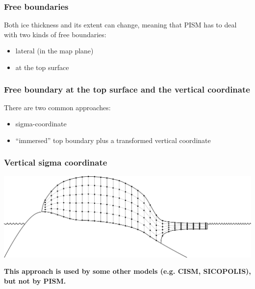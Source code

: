 \documentclass[hide notes,intlimits]{beamer}
\begin{document}
\begin{frame}
  \frametitle{Free boundaries}
  Both ice thickness and its extent can change, meaning that PISM has
  to deal with two kinds of free boundaries:

  \begin{itemize}
  \item lateral (in the map plane)
  \item at the top surface
  \end{itemize}
\end{frame}


\begin{frame}
  \frametitle{Free boundary at the top surface and the vertical coordinate}
  There are two common approaches:
  \begin{itemize}
  \item sigma-coordinate
  \item ``immersed'' top boundary plus a transformed vertical
    coordinate
  \end{itemize}
\end{frame}

\begin{frame}
  \frametitle{Vertical sigma coordinate}
  \begin{center}
    \includegraphics[width=\linewidth]{grid-vertical-sigma}

    \textbf{This approach is used by some other models (e.g. CISM,
      SICOPOLIS), but not by PISM.}
  \end{center}
\end{frame}
\end{document}

